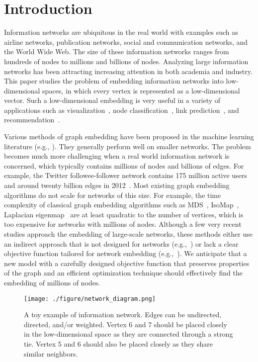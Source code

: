 \documentclass{sig-alternate-2013}
\begin{document}
\section{Introduction}
\label{sec::introduction}










Information networks are ubiquitous in the real world with examples such as airline networks, publication networks, social and communication networks, and the World Wide Web. The size of these information networks ranges from hundreds of nodes to millions and billions of nodes. Analyzing large information networks has been attracting increasing attention in both academia and industry. This paper studies the problem of embedding information networks into low-dimensional spaces, in which every vertex is represented as a low-dimensional vector. Such a low-dimensional embedding is very useful in a variety of applications such as visualization~\cite{van2008visualizing}, node classification~\cite{bhagat2011node}, link prediction~\cite{liben2007link}, and recommendation~\cite{yu2014personalized}. 





Various methods of graph embedding have been proposed in the machine learning literature (e.g., \cite{cox2000multidimensional, tenenbaum2000global, belkin2001laplacian}). They generally perform well on smaller networks. The problem becomes much more challenging when a real world information network is concerned, which typically contains millions of nodes and billions of edges. For example, the Twitter followee-follower network contains 175 million active users and around twenty billion edges in 2012~\cite{myers2014information}. Most existing graph embedding algorithms do not scale for networks of this size. For example, the time complexity of classical graph embedding algorithms such as MDS~\cite{cox2000multidimensional}, IsoMap~\cite{tenenbaum2000global}, Laplacian eigenmap~\cite{belkin2001laplacian} are at least quadratic to the number of vertices, which is too expensive for networks with millions of nodes. Although a few very recent studies approach the embedding of large-scale networks, these methods either use an indirect approach that is not designed for networks (e.g.,~\cite{ahmed2013distributed}) or lack a clear objective function tailored for network embedding (e.g.,~\cite{perozzi2014deepwalk}). 
We anticipate that a new model with a carefully designed objective function that preserves properties of the graph and an efficient optimization technique should effectively find the embedding of millions of nodes. 
\begin{figure}
	\centering
	\texttt{[image: ./figure/network\_diagram.png]}
	\caption{A toy example of information network. Edges can be undirected, directed, and/or weighted. Vertex 6 and 7 should be placed closely in the low-dimensional space as they are connected through a strong tie. Vertex 5 and 6 should also be placed closely as they share similar neighbors. }
	\label{fig::motivation}
\end{figure}
\end{document}
